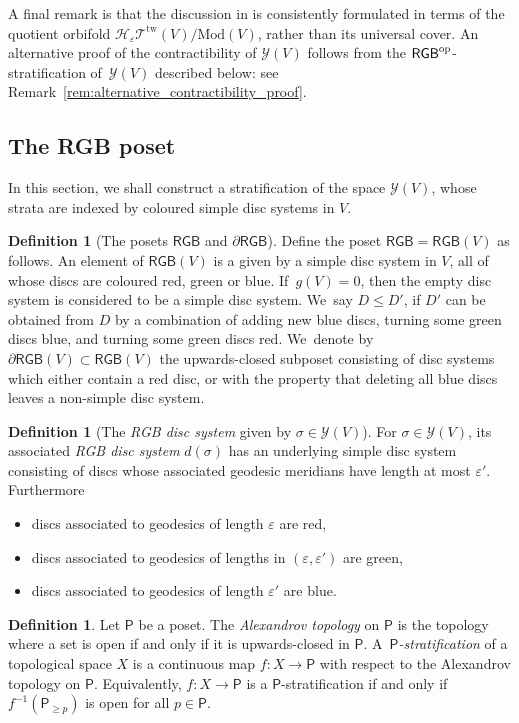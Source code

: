 \documentclass[JEP,XML,SOM,Unicode,NoFloatCountersInSection,published]{cedram}
\theoremstyle{plain}
\theoremstyle{definition}
\newtheorem{defn}[thm]{Definition}
\let\eps\varepsilon
\newcommand{\TT}{\mathcal T^{\mathrm{tw}}}
\newcommand{\Y}{\mathcal Y}
\newcommand{\RGB}{{\mathsf{RGB}}}
\newcommand{\dRGB}{\partial\mathsf{RGB}}
\newcommand{\Po}{\mathsf{P}}
\newcommand{\hmod}{\mathrm{Mod}}
\begin{document}
A final remark is that the discussion in \cite{hainautpetersen} is consistently formulated in terms of the quotient orbifold $\mathcal{H}_\eps\TT(V)/\hmod(V)$, rather than its universal cover. An alternative proof of the contractibility of $\Y(V)$ follows from the $\RGB^\textnormal{op}$-stratification of~$\Y(V)$ described below: see Remark~\ref{rem:alternative_contractibility_proof}.

\subsection{The RGB poset}

In this section, we shall construct a stratification of the space $\mathcal Y(V)$, whose strata are indexed by coloured simple disc systems in $V$.

\begin{defn}[The posets $\RGB$ and $\dRGB$] Define the poset $\RGB=\RGB(V)$ as follows. An element of $\RGB(V)$ is a given by a simple disc system in $V$, all of whose discs are coloured red, green or blue. If~$g(V)=0$, then the empty disc system is considered to be a simple disc system. We~say $D \leq D'$, if $D'$ can be obtained from $D$ by a combination of adding new blue discs, turning some green discs blue, and turning some green discs red. We~denote by $\dRGB(V) \subset \RGB(V)$ the upwards-closed subposet consisting of disc systems which either contain a red disc, or with the property that deleting all blue discs leaves a non-simple disc system.
\end{defn}

\begin{defn}[The \emph{RGB disc system} given by $\sigma \in \mathcal{Y}(V)$] \label{def of RGB stratification}
For $\sigma \in \mathcal{Y}(V)$, its associated \emph{RGB disc system} $d(\sigma)$ has an underlying simple disc system consisting of discs whose associated geodesic meridians have length at most $\eps'$. Furthermore
\begin{itemize}
	\item discs associated to geodesics of length $\eps$ are red,
	\item discs associated to geodesics of lengths in $(\eps,\eps')$ are green,
	\item discs associated to geodesics of length $\eps'$ are blue.
\end{itemize}
\end{defn}

\begin{defn}
Let $\Po$ be a poset. The \emph{Alexandrov topology} on $\Po$ is the topology where a set is open if and only if it is upwards-closed in $\Po$. A~\emph{$\Po$-stratification} of a topological space $X$ is a continuous map $f \colon X \to \Po$ with respect to the Alexandrov topology on $\Po$. Equivalently, $f \colon X \to \Po$ is a $\Po$-stratification if and only if $f^{-1}(\Po_{\geq p})$ is open for all $p \in \Po$.
\end{defn}
\end{document}

